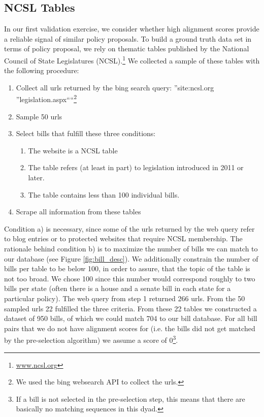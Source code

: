 \documentclass[12pt]{article} %
\begin{document}
\subsection{NCSL Tables}

In our first validation exercise, we consider whether high alignment scores provide a reliable signal of similar policy proposals. To build a ground truth data set in terms of policy proposal, we rely on thematic tables published by the National Council of State Legislatures (NCSL).\footnote{\url{www.ncsl.org}}  We collected a sample of these tables with the following procedure:

\begin{singlespacing}

\begin{enumerate}
    \item Collect all urls returned by the bing search query: ''site:ncsl.org ''legislation.aspx````\footnote{We used the bing websearch API to collect the urls.}
    \item Sample 50 urls
    \item Select bills that fulfill these three conditions:
        \begin{enumerate}
            \item The website is a NCSL table
            \item The table refers (at least in part) to legislation introduced in 2011 or later.             \item The table contains less than 100 individual bills. 
        \end{enumerate}
    \item Scrape all information from these tables
\end{enumerate}

\end{singlespacing}

Condition a) is necessary, since some of the urls returned by the web query refer to blog entries or to protected websites that require NCSL membership. The rationale behind condition b) is to maximize the number of bills we can match to our database (see Figure \ref{fig:bill_desc}). We additionally constrain the number of bills per table to be below 100, in order to assure, that the topic of the table is not too broad. We chose 100 since this number would correspond roughly to two bills per state (often there is a house and a senate bill in each state for a particular policy).
The web query from step 1 returned 266 urls. From the 50 sampled urls 22
fulfilled the three criteria. From these 22 tables we constructed a dataset of
950 bills, of which we could match 704 to our bill database. For all bill pairs
that we do not have alignment scores for (i.e. the bills did not get matched by
the pre-selection algorithm) we assume a score of 0\footnote{If a bill is not selected in the pre-selection step, this means
that there are basically no matching sequences in this dyad.}. 
\end{document}
